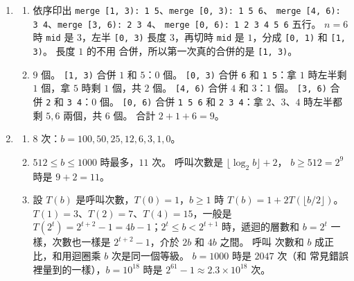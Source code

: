 \begin{enumerate}
\item
\begin{enumerate}
\item 依序印出 \texttt{merge [1, 3): 1 5}、\texttt{merge [0, 3): 1 5 6}、
\texttt{merge [4, 6): 3 4}、\texttt{merge [3, 6): 2 3 4}、
\texttt{merge [0, 6): 1 2 3 4 5 6} 五行。
$n = 6$ 時 \texttt{mid} 是 $3$，左半 \texttt{[0, 3)} 長度 $3$，再切時
\texttt{mid} 是 $1$，分成 \texttt{[0, 1)} 和 \texttt{[1, 3)}。 長度 $1$ 的不用
合併，所以第一次真的合併的是 \texttt{[1, 3)}。
\item $9$ 個。 \texttt{[1, 3)} 合併 $1$ 和 $5$：$0$ 個。 \texttt{[0, 3)} 合併
\texttt{6} 和 \texttt{1 5}：拿 $1$ 時左半剩 $1$ 個，拿 $5$ 時剩 $1$ 個，共 $2$
個。 \texttt{[4, 6)} 合併 $4$ 和 $3$：$1$ 個。 \texttt{[3, 6)} 合併 \texttt{2}
和 \texttt{3 4}：$0$ 個。 \texttt{[0, 6)} 合併 \texttt{1 5 6} 和
\texttt{2 3 4}：拿 $2$、$3$、$4$ 時左半都剩 $5, 6$ 兩個，共 $6$ 個。 合計
$2 + 1 + 6 = 9$。
\end{enumerate}

\item
\begin{enumerate}
\item $8$ 次：$b = 100, 50, 25, 12, 6, 3, 1, 0$。
\item $512 \le b \le 1000$ 時最多，$11$ 次。 呼叫次數是 $\lfloor \log_2 b \rfloor + 2$，
$b \ge 512 = 2^9$ 時是 $9 + 2 = 11$。
\item 設 $T(b)$ 是呼叫次數，$T(0) = 1$，$b \ge 1$ 時 $T(b) = 1 + 2T(\lfloor b/2 \rfloor)$。
$T(1) = 3$、$T(2) = 7$、$T(4) = 15$，一般是 $T(2^t) = 2^{t+2} - 1 = 4b - 1$；$2^t \le b < 2^{t+1}$ 時，遞迴的層數和 $b = 2^t$ 一樣，次數也一樣是 $2^{t+2} - 1$，介於 $2b$ 和 $4b$ 之間。 呼叫
次數和 $b$ 成正比，和用迴圈乘 $b$ 次是同一個等級。 $b = 1000$ 時是 $2047$ 次（和
常見錯誤裡量到的一樣），$b = 10^{18}$ 時是 $2^{61} - 1 \approx 2.3 \times 10^{18}$ 次。
\end{enumerate}



\end{enumerate}
